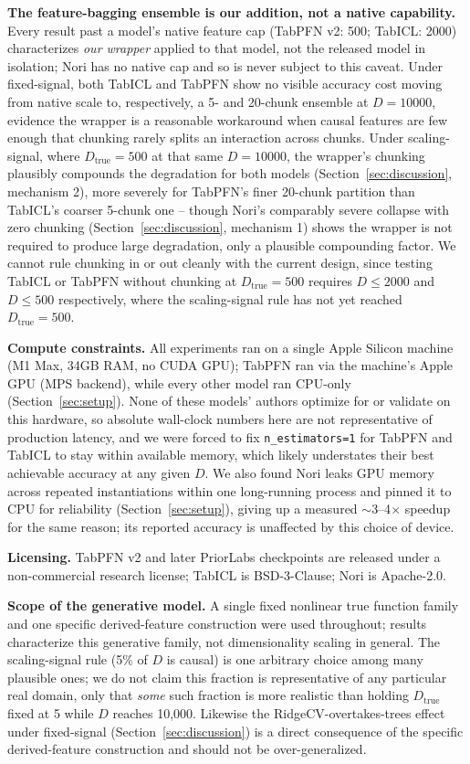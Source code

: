 \documentclass{article}
\begin{document}
\textbf{The feature-bagging ensemble is our addition, not a native capability.} Every
result past a model's native feature cap (TabPFN v2: 500; TabICL: 2000) characterizes
\emph{our wrapper} applied to that model, not the released model in isolation; Nori
has no native cap and so is never subject to this caveat. Under fixed-signal, both
TabICL and TabPFN show no visible accuracy cost moving from native scale to,
respectively, a 5- and 20-chunk ensemble at $D=10000$, evidence the wrapper is a
reasonable workaround when causal features are few enough that chunking rarely splits
an interaction across chunks. Under scaling-signal, where $D_{\text{true}}=500$ at
that same $D=10000$, the wrapper's chunking plausibly compounds the degradation for
both models (Section~\ref{sec:discussion}, mechanism 2), more severely for TabPFN's
finer 20-chunk partition than TabICL's coarser 5-chunk one -- though Nori's comparably
severe collapse with zero chunking (Section~\ref{sec:discussion}, mechanism 1) shows
the wrapper is not required to produce large degradation, only a plausible compounding
factor. We cannot rule chunking in or out cleanly with the current design, since
testing TabICL or TabPFN without chunking at $D_{\text{true}}=500$ requires
$D \leq 2000$ and $D \leq 500$ respectively, where the scaling-signal rule has not yet
reached $D_{\text{true}}=500$.

\textbf{Compute constraints.} All experiments ran on a single Apple Silicon machine
(M1 Max, 34GB RAM, no CUDA GPU); TabPFN ran via the machine's Apple GPU (MPS
backend), while every other model ran CPU-only (Section~\ref{sec:setup}). None of
these models' authors optimize for or validate on this hardware, so absolute
wall-clock numbers here are not representative of production latency, and we were
forced to fix \verb|n_estimators=1| for TabPFN and TabICL to stay within available
memory, which likely understates their best achievable accuracy at any given $D$. We
also found Nori leaks GPU memory across repeated instantiations within one
long-running process and pinned it to CPU for reliability
(Section~\ref{sec:setup}), giving up a measured $\sim$3--4$\times$ speedup for the
same reason; its reported accuracy is unaffected by this choice of device.

\textbf{Licensing.} TabPFN v2 and later PriorLabs checkpoints are released under a
non-commercial research license; TabICL is BSD-3-Clause; Nori is Apache-2.0.

\textbf{Scope of the generative model.} A single fixed nonlinear true function family
and one specific derived-feature construction were used throughout; results
characterize this generative family, not dimensionality scaling in general. The
scaling-signal rule (5\% of $D$ is causal) is one arbitrary choice among many
plausible ones; we do not claim this fraction is representative of any particular
real domain, only that \emph{some} such fraction is more realistic than holding
$D_{\text{true}}$ fixed at 5 while $D$ reaches 10,000. Likewise the
RidgeCV-overtakes-trees effect under fixed-signal (Section~\ref{sec:discussion}) is a
direct consequence of the specific derived-feature construction and should not be
over-generalized.
\end{document}
